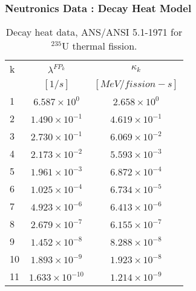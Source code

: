 \begin{frame}[fragile]
  \frametitle{Neutronics Data : Decay Heat Model}
    \begin{table}
      \begin{tabular}{|l|c|c|}
        \hline
        k & $\lambda^{FP_k}$ & $\kappa_k$\\
                          &  $[1/s]$         & $[MeV/fission-s]$ \\
        \hline
        1   &  $ 6.587\times10^{  0} $  &  $ 2.658\times10^{  0}$ \\
        2   &  $ 1.490\times10^{ -1} $  &  $ 4.619\times10^{ -1}$ \\
        3   &  $ 2.730\times10^{ -1} $  &  $ 6.069\times10^{ -2}$ \\
        4   &  $ 2.173\times10^{ -2} $  &  $ 5.593\times10^{ -3}$ \\
        5   &  $ 1.961\times10^{ -3} $  &  $ 6.872\times10^{ -4}$ \\
        6   &  $ 1.025\times10^{ -4} $  &  $ 6.734\times10^{ -5}$ \\
        7   &  $ 4.923\times10^{ -6} $  &  $ 6.413\times10^{ -6}$ \\
        8   &  $ 2.679\times10^{ -7} $  &  $ 6.155\times10^{ -7}$ \\
        9   &  $ 1.452\times10^{ -8} $  &  $ 8.288\times10^{ -8}$ \\
       10   &  $ 1.893\times10^{ -9} $  &  $ 1.923\times10^{ -8}$ \\
       11   &  $ 1.633\times10^{-10} $  &  $ 1.214\times10^{ -9}$ \\
       \hline
      \end{tabular}
      \caption{Decay heat data, ANS/ANSI 5.1-1971 for $^{235}$U thermal fission.}
      \label{tab:decayheat}
    \end{table}

\end{frame}


